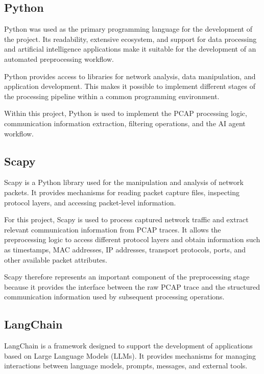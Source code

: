 \subsection{Python}

Python was used as the primary programming language for the development of the project. Its readability, extensive ecosystem, and support for data processing and artificial intelligence applications make it suitable for the development of an automated preprocessing workflow.

Python provides access to libraries for network analysis, data manipulation, and application development. This makes it possible to implement different stages of the processing pipeline within a common programming environment.

Within this project, Python is used to implement the PCAP processing logic, communication information extraction, filtering operations, and the AI agent workflow.

\subsection{Scapy}

Scapy is a Python library used for the manipulation and analysis of network packets. It provides mechanisms for reading packet capture files, inspecting protocol layers, and accessing packet-level information.

For this project, Scapy is used to process captured network traffic and extract relevant communication information from PCAP traces. It allows the preprocessing logic to access different protocol layers and obtain information such as timestamps, MAC addresses, IP addresses, transport protocols, ports, and other available packet attributes.

Scapy therefore represents an important component of the preprocessing stage because it provides the interface between the raw PCAP trace and the structured communication information used by subsequent processing operations.

\subsection{LangChain}

LangChain is a framework designed to support the development of applications based on Large Language Models (LLMs). It provides mechanisms for managing interactions between language models, prompts, messages, and external tools.

